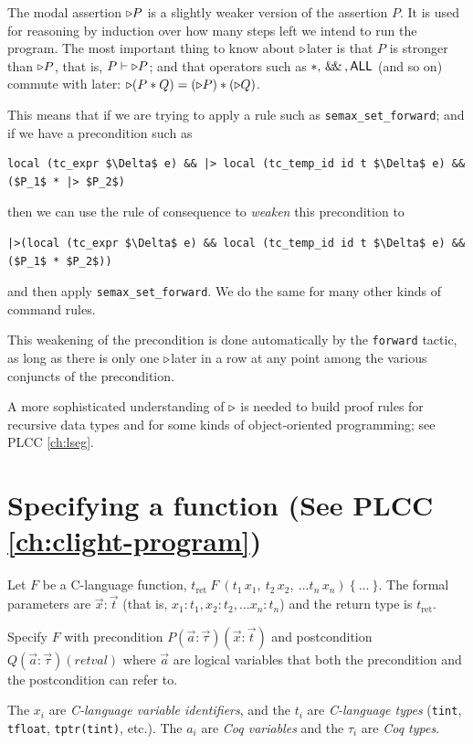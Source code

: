 \documentclass[12pt,fleqn,openany,oneside,showtrims]{memoir}
\newcommand{\ychapter}[2]{\chapter[#1]{#1 \hfill \normalsize #2}}
\begin{document}
The modal assertion $\triangleright P$ is a slightly weaker version of the
assertion $P$.  It is used for reasoning by induction over how many
steps left we intend to run the program.  The most important
thing to know about $\triangleright$later is that $P$ is stronger than
$\triangleright P$, that is, $P \vdash \triangleright P$; and that operators such
as $*, \,\mathsf{\&\hspace{-.2em}\&}\,, \mathsf{ALL}$ (and so on) commute with later:
$\triangleright (P*Q)= (\triangleright P) * (\triangleright Q)$.

This means that if we are trying to apply a rule such as
\lstinline{semax_set_forward}; and if we
have a precondition such as
\begin{lstlisting}
local (tc_expr $\Delta$ e) && |> local (tc_temp_id id t $\Delta$ e) && ($P_1$ * |> $P_2$)
\end{lstlisting}
then we can use the rule of consequence to \emph{weaken}
this precondition to
\begin{lstlisting}
|>(local (tc_expr $\Delta$ e) && local (tc_temp_id id t $\Delta$ e) && ($P_1$ * $P_2$))
\end{lstlisting}
and then apply \lstinline{semax_set_forward}.  We do the same for many other kinds of command rules.

This weakening of the precondition is done automatically by the 
\lstinline{forward} tactic, as long as there is only one
$\triangleright$later in a row at any point among the various conjuncts of
the precondition.

A more sophisticated understanding of $\triangleright$ is needed to 
build proof rules for recursive data types and for 
some kinds of object-oriented programming; see PLCC \autoref{ch:lseg}.


\ychapter{Specifying a function}{(See PLCC \autoref{ch:clight-program})}

Let $F$ be a C-language function, $t_\mathrm{ret}~F~(t_1\, x_1,~t_2\, x_2,~\ldots t_n\, x_n)~\{~\ldots~\}$.
\linebreak
The formal parameters are
$\vec{x}:\vec{t}$ (that is, $x_1:t_1, x_2:t_2, \ldots
x_n:t_n$) and the return type is $t_\mathrm{ret}$.

Specify $F$ with precondition $P(\vec{a}:\vec{\tau})(\vec{x}:\vec{t})$
and postcondition
\linebreak $Q(\vec{a}:\vec{\tau})(\mathit{retval})$
where $\vec{a}$ are logical variables that both the 
precondition and the postcondition can refer to.

The $x_i$ are \emph{C-language variable identifiers},
and the $t_i$ are \emph{C-language types} 
(\lstinline{tint}, \lstinline{tfloat}, \lstinline{tptr(tint)}, 
etc.).
The $a_i$ are \emph{Coq variables} and the $\tau_i$ are \emph{Coq types}.
\end{document}
